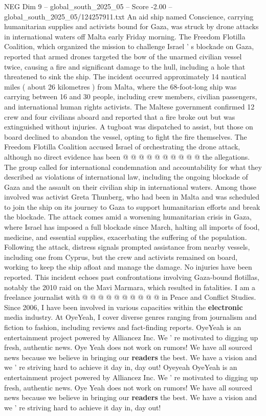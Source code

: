 \begin{textsample}{NEG Dim 9 – global\_south\_2025\_05 – Score -2.00 – global\_south\_2025\_05/124257911.txt}  \label{ex:f9_neg_251}
An aid ship named Conscience, carrying humanitarian supplies and activists bound for Gaza, was struck by drone attacks in international waters off Malta early Friday morning.
The Freedom Flotilla Coalition, which organized the mission to challenge Israel ' s blockade on Gaza, reported that armed drones targeted the bow of the unarmed civilian vessel twice, causing a fire and significant damage to the hull, including a hole that threatened to sink the ship.
The incident occurred approximately 14 nautical miles ( about 26 kilometres ) from Malta, where the 68-foot-long ship was carrying between 16 and 30 people, including crew members, civilian passengers, and international human rights activists.
The Maltese government confirmed 12 crew and four civilians aboard and reported that a fire broke out but was extinguished without injuries.
A tugboat was dispatched to assist, but those on board declined to abandon the vessel, opting to fight the fire themselves.
The Freedom Flotilla Coalition accused Israel of orchestrating the drone attack, although no direct evidence has been @ @ @ @ @ @ @ @ @ @ the allegations.
The group called for international condemnation and accountability for what they described as violations of international law, including the ongoing blockade of Gaza and the assault on their civilian ship in international waters.
Among those involved was activist Greta Thunberg, who had been in Malta and was scheduled to join the ship on its journey to Gaza to support humanitarian efforts and break the blockade.
The attack comes amid a worsening humanitarian crisis in Gaza, where Israel has imposed a full blockade since March, halting all imports of food, medicine, and essential supplies, exacerbating the suffering of the population.
Following the attack, distress signals prompted assistance from nearby vessels, including one from Cyprus, but the crew and activists remained on board, working to keep the ship afloat and manage the damage.
No injuries have been reported.
This incident echoes past confrontations involving Gaza-bound flotillas, notably the 2010 raid on the Mavi Marmara, which resulted in fatalities.
I am a freelance journalist with @ @ @ @ @ @ @ @ @ @ in Peace and Conflict Studies.
Since 2006, I have been involved in various capacities within the \textbf{electronic} media industry.
At OyeYeah, I cover diverse genres ranging from journalism and fiction to fashion, including reviews and fact-finding reports.
OyeYeah is an entertainment project powered by Alliancez Inc.
We ' re motivated to digging up fresh, authentic news.
Oye Yeah does not work on rumors!
We have all sourced news because we believe in bringing our \textbf{readers} the best.
We have a vision and we ' re striving hard to achieve it day in, day out!
Oyeyeah OyeYeah is an entertainment project powered by Alliancez Inc.
We ' re motivated to digging up fresh, authentic news.
Oye Yeah does not work on rumors!
We have all sourced news because we believe in bringing our \textbf{readers} the best.
We have a vision and we ' re striving hard to achieve it day in, day out!

\end{textsample}
